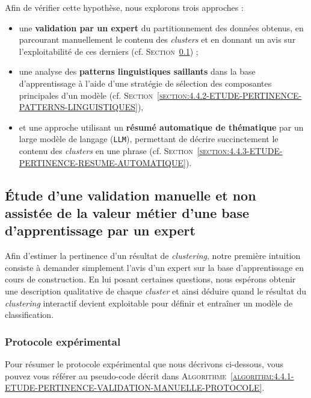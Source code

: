 	Afin de vérifier cette hypothèse, nous explorons trois approches :
	\begin{itemize}
		\item une \textbf{validation par un expert} du partitionnement des données obtenus, en parcourant manuellement le contenu des \textit{clusters} et en donnant un avis sur l'exploitabilité de ces derniers (cf. \textsc{Section~\ref{section:4.4.1-ETUDE-PERTINENCE-VALIDATION-MANUELLE}}) ;
		\item une analyse des \textbf{patterns linguistiques saillants} dans la base d'apprentissage à l'aide d'une stratégie de sélection des composantes principales d'un modèle (cf. \textsc{Section~\ref{section:4.4.2-ETUDE-PERTINENCE-PATTERNS-LINGUISTIQUES}}),
		\item et une approche utilisant un \textbf{résumé automatique de thématique} par un large modèle de langage (\texttt{LLM}), permettant de décrire succinctement le contenu des \textit{clusters} en une phrase (cf. \textsc{Section~\ref{section:4.4.3-ETUDE-PERTINENCE-RESUME-AUTOMATIQUE}}).
	\end{itemize}
	
	
	\subsection{Étude d'une validation manuelle et non assistée de la valeur métier d'une base d'apprentissage par un expert}
	\label{section:4.4.1-ETUDE-PERTINENCE-VALIDATION-MANUELLE}
		
		Afin d'estimer la pertinence d'un résultat de \textit{clustering}, notre première intuition consiste à demander simplement l'avis d'un expert sur la base d'apprentissage en cours de construction.
		En lui posant certaines questions, nous espérons obtenir une description qualitative de chaque \textit{cluster} et ainsi déduire quand le résultat du \textit{clustering} interactif devient exploitable pour définir et entraîner un modèle de classification.
	
		\subsubsection{Protocole expérimental}
			
			Pour résumer le protocole expérimental que nous décrivons ci-dessous, vous pouvez vous référer au pseudo-code décrit dans \textsc{Algorithme~\ref{algorithm:4.4.1-ETUDE-PERTINENCE-VALIDATION-MANUELLE-PROTOCOLE}}.
			
